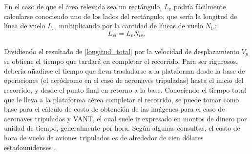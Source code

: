 En el caso de que el área relevada sea un rectángulo, $L_v$ podría fácilmente calcularse conociendo uno de los lados del rectángulo, que sería la longitud de línea de vuelo $L_v$, multiplicando por la cantidad de líneas de vuelo $N_{lv}$:
\\
\begin{equation}
	L_{vt}={L_v}{N_{lv}},\label{longitud_total}
\end{equation}
\\
Dividiendo el resultado de \ref{longitud_total} por la velocidad de desplazamiento $V_p$ se obtiene el tiempo que tardará en completar el recorrido. Para ser rigurosos, debería añadirse el tiempo que lleva trasladarse a la plataforma desde la base de operaciones (el aeródromo en el caso de aeronaves tripuladas) hasta el inicio del recorrido, y desde el punto final en retorno a la base.
Conociendo el tiempo total que le lleva a la plataforma aérea completar el recorrido, se puede tomar como base para el cálculo de costo de obtención de las imágenes para el caso de aeronaves tripuladas y VANT, el cual suele ir expresado en montos de dinero por unidad de tiempo, generalmente por hora. Según algunas consultas, el costo de hora de vuelo de aviones tripulados es de alrededor de cien dólares estadounidenses \cite{}.

